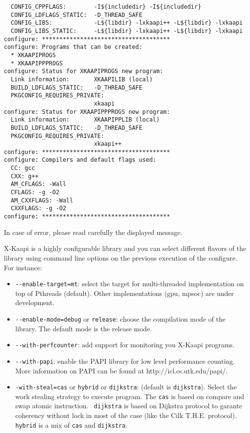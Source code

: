 \documentclass{article}
\newcommand{\kaapi}{\textsc{X}-Kaapi\xspace}
\begin{document}
\begin{verbatim}
  CONFIG_CPPFLAGS:        -I${includedir} -I${includedir}
  CONFIG_LDFLAGS_STATIC:  -D_THREAD_SAFE 
  CONFIG_LIBS:            -L${libdir} -lxkaapi++ -L${libdir} -lxkaapi
  CONFIG_LIBS_STATIC:     -L${libdir} -lxkaapi++ -L${libdir} -lxkaapi
configure: *************************************
configure: Programs that can be created: 
  * XKAAPIPROGS
  * XKAAPIPPPROGS
configure: Status for XKAAPIPROGS new program:
  Link information:       XKAAPILIB (local)
  BUILD_LDFLAGS_STATIC:   -D_THREAD_SAFE 
  PKGCONFIG_REQUIRES_PRIVATE:
                          xkaapi
configure: Status for XKAAPIPPPROGS new program:
  Link information:       XKAAPIPPLIB (local)
  BUILD_LDFLAGS_STATIC:   -D_THREAD_SAFE 
  PKGCONFIG_REQUIRES_PRIVATE:
                          xkaapi++
configure: *************************************
configure: Compilers and default flags used:
  CC: gcc
  CXX: g++
  AM_CFLAGS: -Wall
  CFLAGS: -g -O2
  AM_CXXFLAGS: -Wall
  CXXFLAGS: -g -O2
configure: *************************************
\end{verbatim}
\bigskip
In case of error, please read carefully the displayed message.

\bigskip
\kaapi is a highly configurable library and you can select different flavors of the library using command line options on the previous execution of the configure. For instance:
\begin{itemize}
\item \verb+--enable-target=mt+: select the target for multi-threaded implementation on top of Pthreads (default). Other implementations (gpu, mpsoc) are under development. 
\item \verb+--enable-mode=debug+ or \verb+release+: choose the compilation mode of the library. The default mode is the release mode.
\item \verb+--with-perfcounter+: add support for monitoring you \kaapi programs.	
\item \verb+--with-papi+: enable the PAPI library for low level performance counting. More information on PAPI can be found at http://icl.cs.utk.edu/papi/.
\item \verb+-with-steal=cas+ or \verb+hybrid+ or \verb+dijkstra+: (default is \verb+dijkstra+). Select the work stealing strategy to execute program. The \verb+cas+ is based on compare and swap atomic instruction. \verb+ dijkstra+ is based on Dijkstra protocol to garante coherency without lock in most of the case (like the Cilk T.H.E. protocol). \verb+hybrid+ is a  mix of \verb+cas+ and \verb+dijkstra+.
\end{itemize}
\end{document}
